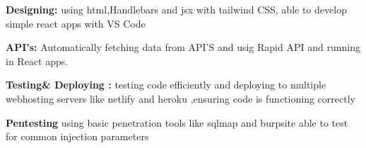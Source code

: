 \documentclass[letterpaper,11pt]{article}
\newcommand{\resumeItem}[1]{
  \item\small{
    {#1 \vspace{-2pt}}
  }
}
\begin{document}
        \resumeItem{\textbf{Designing:} using html,Handlebars and jsx with tailwind CSS, able to develop simple react apps with VS Code  }
        \resumeItem{\textbf{API's:} Automatically fetching data from API'S and usig Rapid API and running in React apps.}
        \resumeItem{\textbf{Testing\& Deploying :} testing code efficiently and deploying  to multiple webhosting servers like netlify and heroku ,ensuring code is functioning correctly}
         \resumeItem{\textbf{Pentesting} using basic penetration tools like sqlmap and burpsite able to test for common injection parameters}
\end{document}
